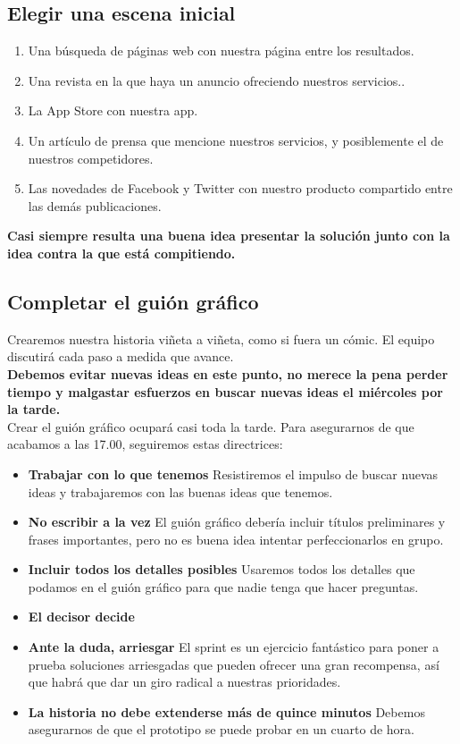 \documentclass[10pt]{article}
\begin{document}
\begin{multicols}{2}
\subsection*{Elegir una escena inicial}
\begin{enumerate}[\bfseries]
\item Una búsqueda de páginas web con nuestra página entre los resultados.
\item Una revista en la que haya un anuncio ofreciendo nuestros servicios..
\item La App Store con nuestra app.
\item Un artículo de prensa que mencione nuestros servicios, y posiblemente el de nuestros competidores.
\item Las novedades de Facebook y Twitter con nuestro producto compartido entre las demás publicaciones.
\end{enumerate}
\textbf{Casi siempre resulta una buena idea presentar la solución junto con la idea contra la que está compitiendo.}
\subsection*{Completar el guión gráfico}
Crearemos nuestra historia viñeta a viñeta, como si fuera un cómic. El equipo discutirá cada paso a medida que avance.\\
\textbf{Debemos evitar nuevas ideas en este punto, no merece la pena perder tiempo y malgastar esfuerzos en buscar nuevas ideas el miércoles por la tarde.}\\
Crear el guión gráfico ocupará casi toda la tarde. Para asegurarnos de que acabamos a las 17.00, seguiremos estas directrices:
\begin{itemize}
\item \textbf{Trabajar con lo que tenemos} Resistiremos el impulso de buscar nuevas ideas y trabajaremos con las buenas ideas que tenemos.
\item \textbf{No escribir a la vez} El guión gráfico debería incluir títulos preliminares y frases importantes, pero no es buena idea intentar perfeccionarlos en grupo.
\item \textbf{Incluir todos los detalles posibles} Usaremos todos los detalles que podamos en el guión gráfico para que nadie tenga que hacer preguntas.
\item \textbf{El decisor decide} 
\item \textbf{Ante la duda, arriesgar} El sprint es un ejercicio fantástico para poner a prueba soluciones arriesgadas que pueden ofrecer una gran recompensa, así que habrá que dar un giro radical a nuestras prioridades.
\item \textbf{La historia no debe extenderse más de quince minutos} 
Debemos asegurarnos de que el prototipo se puede probar en un cuarto de hora. 
\end{itemize}
\end{multicols}
\end{document}
